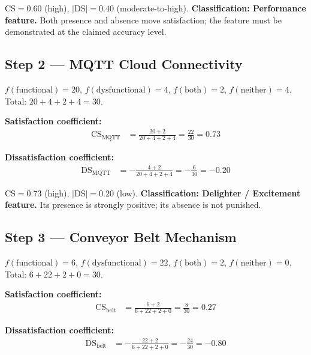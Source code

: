 \noindent
$\mathrm{CS} = 0.60$ (high), $|\mathrm{DS}| = 0.40$ (moderate-to-high).
\textbf{Classification: Performance feature.}
Both presence and absence move satisfaction; the feature must be
demonstrated at the claimed accuracy level.

\subsection{Step 2 --- MQTT Cloud Connectivity}
\label{subsec:ch2-ex-mqtt}

$f(\text{functional}) = 20$,
$f(\text{dysfunctional}) = 4$,
$f(\text{both}) = 2$,
$f(\text{neither}) = 4$.
Total: $20 + 4 + 2 + 4 = 30$. \checkmark

\noindent
\textbf{Satisfaction coefficient:}
\begin{align}
  \mathrm{CS}_{\text{MQTT}} &= \frac{20 + 2}{20 + 4 + 2 + 4}
  = \frac{22}{30}
  = 0.73
  \label{eq:ch2-cs-mqtt}
\end{align}

\noindent
\textbf{Dissatisfaction coefficient:}
\begin{align}
  \mathrm{DS}_{\text{MQTT}} &= -\frac{4 + 2}{20 + 4 + 2 + 4}
  = -\frac{6}{30}
  = -0.20
  \label{eq:ch2-ds-mqtt}
\end{align}

\noindent
$\mathrm{CS} = 0.73$ (high), $|\mathrm{DS}| = 0.20$ (low).
\textbf{Classification: Delighter / Excitement feature.}
Its presence is strongly positive; its absence is not punished.

\subsection{Step 3 --- Conveyor Belt Mechanism}
\label{subsec:ch2-ex-belt}

$f(\text{functional}) = 6$,
$f(\text{dysfunctional}) = 22$,
$f(\text{both}) = 2$,
$f(\text{neither}) = 0$.
Total: $6 + 22 + 2 + 0 = 30$. \checkmark

\noindent
\textbf{Satisfaction coefficient:}
\begin{align}
  \mathrm{CS}_{\text{belt}} &= \frac{6 + 2}{6 + 22 + 2 + 0}
  = \frac{8}{30}
  = 0.27
  \label{eq:ch2-cs-belt}
\end{align}

\noindent
\textbf{Dissatisfaction coefficient:}
\begin{align}
  \mathrm{DS}_{\text{belt}} &= -\frac{22 + 2}{6 + 22 + 2 + 0}
  = -\frac{24}{30}
  = -0.80
  \label{eq:ch2-ds-belt}
\end{align}

